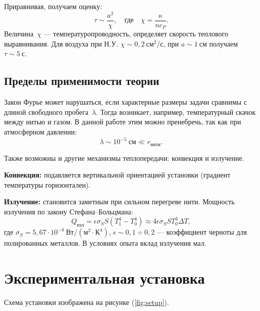 \documentclass[a4paper,12pt]{article} %
\begin{document}
Приравнивая, получаем оценку:
\[
\tau \sim \frac{a^2}{\chi}, \quad \text{где} \quad \chi = \frac{\kappa}{n c_P}.
\]
Величина~$\chi$ — температуропроводность, определяет скорость теплового выравнивания. Для воздуха при Н.У. $\chi \sim 0{,}2~\text{см}^2/\text{с}$, при $a \sim 1~\text{см}$ получаем~$\tau \sim 5~\text{с}$.

\subsection*{Пределы применимости теории}

Закон Фурье может нарушаться, если характерные размеры задачи сравнимы с длиной свободного пробега~$\lambda$. Тогда возникает, например, температурный скачок между нитью и газом. В данной работе этим можно пренебречь, так как при атмосферном давлении:
\[
\lambda \sim 10^{-5}~\text{см} \ll r_\text{нити}.
\]

Также возможны и другие механизмы теплопередачи: конвекция и излучение.

\textbf{Конвекция:} подавляется вертикальной ориентацией установки (градиент температуры горизонтален).

\textbf{Излучение:} становится заметным при сильном перегреве нити. Мощность излучения по закону Стефана–Больцмана:
\[
Q_{\text{изл}} = \epsilon \sigma_S S (T_1^4 - T_0^4) \approx 4 \epsilon \sigma_S S T_0^3 \Delta T,
\]
где $\sigma_S = 5{,}67 \cdot 10^{-8}~\text{Вт}/(\text{м}^2\cdot\text{К}^4)$, $\epsilon \sim 0{,}1 \div 0{,}2$ — коэффициент черноты для полированных металлов. В условиях опыта вклад излучения мал.



\section*{Экспериментальная установка}

Схема установки изображена на рисунке (\ref{fig:setup}). 
\end{document}
